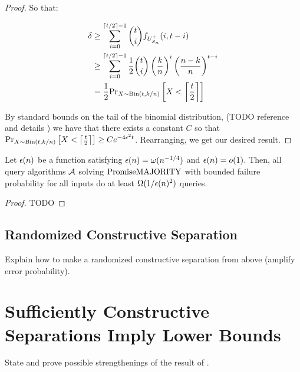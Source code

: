 \begin{proof}
So that:

\begin{align*}
\delta & \geq \sum_{i=0}^{\lceil t/2 \rceil-1} \binom{t}{i} f_{U^+_{S_n}}(i, t-i) \\
       & \geq \sum_{i=0}^{\lceil t/2 \rceil-1} \frac{1}{2} \binom{t}{i} \left(\frac{k}{n}\right)^i \left(\frac{n-k}{n} \right)^{t-i} \\
       & = \frac{1}{2} \text{Pr}_{X \sim \text{Bin}(t, k/n)}\left[X < \left\lceil \frac{t}{2} \right\rceil\right]
\end{align*}

By standard bounds on the tail of the binomial distribution,
(TODO reference and details )
we have that there exists a constant $C$ so that 
$\text{Pr}_{X \sim \text{Bin}(t, k/n)}\left[X < \left\lceil \frac{t}{2} \right\rceil\right] \geq C e^{-4\epsilon^2t}$.
Rearranging, we get our desired result. 

\end{proof}

\begin{corollary}
Let $\epsilon(n)$ be a function satisfying $\epsilon(n) = \omega(n^{-1/4})$ and $\epsilon(n) = o(1)$. Then, all query
algorithms $\mathcal{A}$ solving $\mathrm{PromiseMAJORITY}$ with bounded failure probability for all inputs do at least $\Omega(1/\epsilon(n)^2)$
queries. 
\end{corollary}
\begin{proof}
TODO 
\end{proof}

\subsection{Randomized Constructive Separation}

Explain how to make a randomized constructive separation from above (amplify error probability).

\begin{theorem}
\label{thm:qarandomizedcs}

\end{theorem}



\section{Sufficiently Constructive Separations Imply Lower Bounds}

State and prove possible strengthenings of the result of \cite{ConstructiveSeparations}. 

